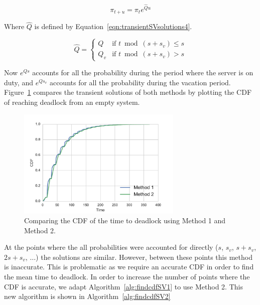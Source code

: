 \documentclass{article}
\begin{document}
\begin{equation}\label{eqn:transientSVsolutions3}
\pi_{t+u} = \pi_{t} e^{\hat{Q}u}
\end{equation}

Where $\hat{Q}$ is defined by Equation~\ref{eqn:transientSVsolutions4}.

\begin{equation}\label{eqn:transientSVsolutions4}
\hat{Q} = \left\{
    \begin{array}{cc}
    Q & \text{if } t \bmod (s + s_v) \leq s \\
    Q_v & \text{if } t \bmod (s + s_v) > s
    \end{array}\right.
\end{equation}

Now $e^{Qs}$ accounts for all the probability during the period where the server is on duty, and $e^{Q s_v}$ accounts for all the probability during the vacation period.
Figure~\ref{fig:method1method2_difftimesteps} compares the transient solutions of both methods by plotting the CDF of reaching deadlock from an empty system.

\begin{figure}[!hbtp]
\begin{center}
    \includegraphics[width=0.7\textwidth]{img/method1method2_difftimestep.pdf}
    \caption{Comparing the CDF of the time to deadlock using Method 1 and Method 2.}
    \label{fig:method1method2_difftimesteps}
\end{center}
\end{figure}

At the points where the all probabilities were accounted for directly ($s$, $s_v$, $s + s_v$, $2s + s_v$, $\dots$) the solutions are similar.
However, between these points this method is inaccurate.
This is problematic as we require an accurate CDF in order to find the mean time to deadlock.
In order to increase the number of points where the CDF is accurate, we adapt Algorithm~\ref{alg:findcdfSV1} to use Method 2.
This new algorithm is shown in Algorithm~\ref{alg:findcdfSV2}
\end{document}
